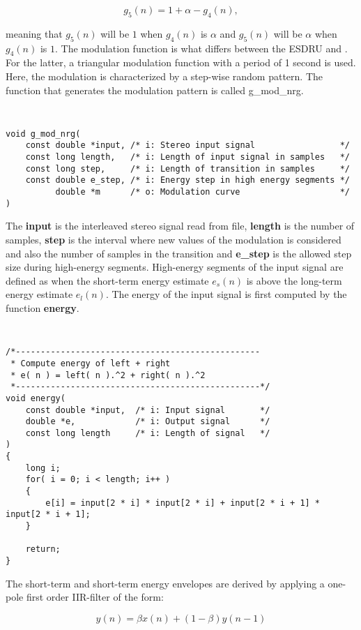   \[
    g_5(n) = 1 + \alpha - g_4(n),
  \]
  
meaning that $g_5(n)$ will be $1$ when $g_4(n)$ is $\alpha$ and $g_5(n)$ will be $\alpha$
 when $g_4(n)$ is $1$. The modulation function is what differs between the ESDRU and
\cite{SDRU}. For the latter, a triangular modulation function with a period of 1 second
is used. Here, the modulation is characterized by a step-wise random pattern. The function
that generates the modulation pattern is called g\_mod\_nrg.

{\tt\small
\begin{verbatim}
void g_mod_nrg(
    const double *input, /* i: Stereo input signal                 */
    const long length,   /* i: Length of input signal in samples   */
    const long step,     /* i: Length of transition in samples     */
    const double e_step, /* i: Energy step in high energy segments */
          double *m      /* o: Modulation curve                    */
)
\end{verbatim}
}

The \textbf{input} is the interleaved stereo signal read from file, \textbf{length} is the number
of samples, \textbf{step} is the interval where new values of the modulation is considered and also
the number of samples in the transition and \textbf{e\_step} is the allowed step size during high-energy
segments. High-energy segments of the input signal are defined as when the short-term energy estimate 
$e_s(n)$ is above the long-term energy estimate $e_l(n)$. The energy of the input signal is first computed
by the function \textbf{energy}.

{\tt\small
\begin{verbatim}
/*-------------------------------------------------
 * Compute energy of left + right
 * e( n ) = left( n ).^2 + right( n ).^2
 *-------------------------------------------------*/
void energy(
    const double *input,  /* i: Input signal       */
    double *e,            /* i: Output signal      */
    const long length     /* i: Length of signal   */
)
{
    long i;
    for( i = 0; i < length; i++ )
    {
        e[i] = input[2 * i] * input[2 * i] + input[2 * i + 1] * input[2 * i + 1];
    }

    return;
} 
\end{verbatim}
}

The short-term and short-term energy envelopes are derived by applying a one-pole first order IIR-filter
of the form:

  \[
    y(n) = \beta x(n) + (1 - \beta) y(n-1)
  \]

